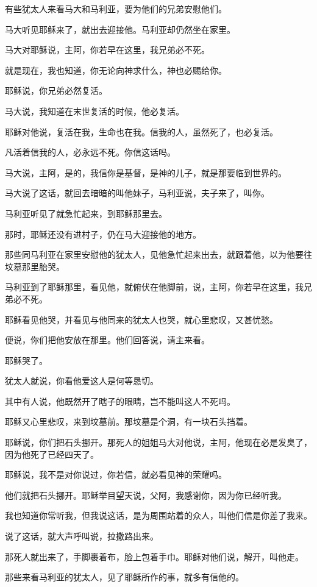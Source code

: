 \documentclass[12pt,oneside]{book}
\begin{document}
有些犹太人来看马大和马利亚，要为他们的兄弟安慰他们。

马大听见耶稣来了，就出去迎接他。马利亚却仍然坐在家里。

马大对耶稣说，主阿，你若早在这里，我兄弟必不死。

就是现在，我也知道，你无论向神求什么，神也必赐给你。

耶稣说，你兄弟必然复活。

马大说，我知道在末世复活的时候，他必复活。

耶稣对他说，复活在我，生命也在我。信我的人，虽然死了，也必复活。

凡活着信我的人，必永远不死。你信这话吗。

马大说，主阿，是的，我信你是基督，是神的儿子，就是那要临到世界的。

马大说了这话，就回去暗暗的叫他妹子，马利亚说，夫子来了，叫你。

马利亚听见了就急忙起来，到耶稣那里去。

那时，耶稣还没有进村子，仍在马大迎接他的地方。

那些同马利亚在家里安慰他的犹太人，见他急忙起来出去，就跟着他，以为他要往坟墓那里胎哭。

马利亚到了耶稣那里，看见他，就俯伏在他脚前，说，主阿，你若早在这里，我兄弟必不死。

耶稣看见他哭，并看见与他同来的犹太人也哭，就心里悲叹，又甚忧愁。

便说，你们把他安放在那里。他们回答说，请主来看。

耶稣哭了。

犹太人就说，你看他爱这人是何等恳切。

其中有人说，他既然开了瞎子的眼睛，岂不能叫这人不死吗。

耶稣又心里悲叹，来到坟墓前。那坟墓是个洞，有一块石头挡着。

耶稣说，你们把石头挪开。那死人的姐姐马大对他说，主阿，他现在必是发臭了，因为他死了已经四天了。

耶稣说，我不是对你说过，你若信，就必看见神的荣耀吗。

他们就把石头挪开。耶稣举目望天说，父阿，我感谢你，因为你已经听我。

我也知道你常听我，但我说这话，是为周围站着的众人，叫他们信是你差了我来。

说了这话，就大声呼叫说，拉撒路出来。

那死人就出来了，手脚裹着布，脸上包着手巾。耶稣对他们说，解开，叫他走。

那些来看马利亚的犹太人，见了耶稣所作的事，就多有信他的。
\end{document}
